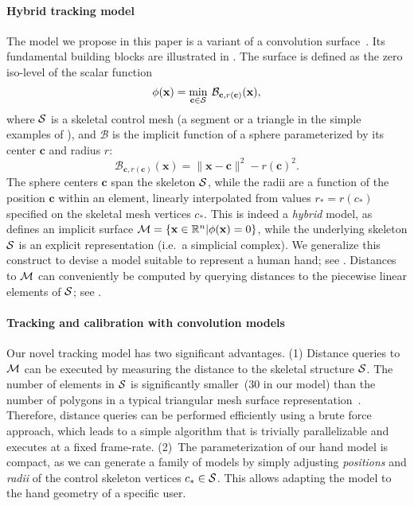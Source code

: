 \paragraph{Hybrid tracking model}
The model we propose in this paper is a variant of a convolution surface~\cite{bloomenthal1991convolution}. Its fundamental building blocks are illustrated in . The surface is defined as the zero iso-level of the scalar function
\begin{equation}
\phi(\mathbf{x}) = \min_{\mathbf{c} \in \mathcal{S}} \: \mathcal{B}_{\mathbf{c}, r(\mathbf{c})}(\mathbf{x}),
\label{eq:convsurf}
\end{equation}
where $\mathcal{S}$ is a skeletal control mesh (a segment or a triangle in the simple examples of ), and $\mathcal{B}$ is the implicit function of a sphere parameterized by its center $\mathbf{c}$ and radius $r$:
\begin{equation}
\mathcal{B}_{\mathbf{c}, r(\mathbf{c})}(\mathbf{x}) = \|\mathbf{x}-\mathbf{c}\|^2 - r(\mathbf{c})^2.
\end{equation}
The sphere centers $\mathbf{c}$ span the skeleton $\mathcal{S}$, while the radii are a function of the position $\mathbf{c}$ within an element, linearly interpolated from values $r_*=r(c_*)$ specified on the skeletal mesh vertices $c_*$. This is indeed a \emph{hybrid} model, as  defines an implicit surface $\mathcal{M} = \{\mathbf{x} \in \mathbb{R}^n | \phi(\mathbf{x})=0 \}$, while the underlying skeleton $\mathcal{S}$ is an explicit representation (i.e.\ a simplicial complex). We generalize this construct to devise a model suitable to represent a human hand; see .
Distances to $\mathcal{M}$ can conveniently be computed by querying distances to the piecewise linear elements of $\mathcal{S}$; see .


\paragraph{Tracking and calibration with convolution models}
Our novel tracking model has two significant advantages. (1) Distance queries to $\mathcal{M}$ can be executed by measuring the distance to the skeletal structure $\mathcal{S}$. The number of elements in $\mathcal{S}$ is significantly smaller~(30 in our model) than the number of polygons in a typical triangular mesh surface representation~\cite{thiery2013sphere}. 
Therefore, distance queries can be performed efficiently using a brute force approach, which leads to a simple algorithm that is trivially parallelizable and executes at a fixed frame-rate. (2)~The parameterization of our hand model is compact, as we can generate a family of models by simply adjusting \emph{positions} and \emph{radii} of the control skeleton vertices $c_* \in \mathcal{S}$. This allows adapting the model to the hand geometry of a specific user.

